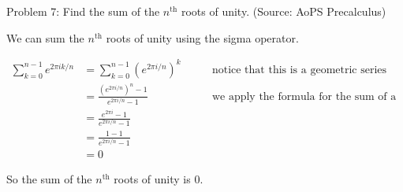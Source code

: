 Problem 7: Find the sum of the $n^{\text{th}}$ roots of unity. (Source: AoPS Precalculus)

We can sum the $n^{\text{th}}$ roots of unity using the sigma operator.

\begin{align*}
\sum_{k=0}^{n-1} e^{2 \pi i k / n} &= \sum_{k=0}^{n-1} (e^{2 \pi i / n})^k &\qquad \text{notice that this is a geometric series} \\
&= \frac{(e^{2 \pi i / n})^n - 1}{e^{2 \pi i / n} - 1} &\qquad \text{we apply the formula for the sum of a geometric series} \\
&= \frac{e^{2 \pi i } - 1}{e^{2 \pi i / n} - 1} \\
&= \frac{1 - 1}{e^{2 \pi i / n} - 1} \\
&= \boxed{0}
\end{align*}

So the sum of the $n^{\text{th}}$ roots of unity is $\boxed{0}$.
